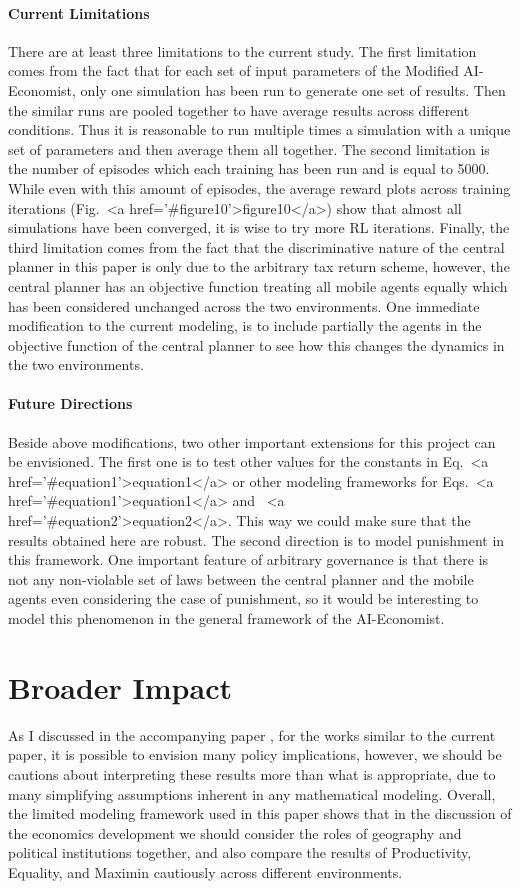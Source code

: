 \documentclass{article}
\begin{document}
\paragraph{Current Limitations} There are at least three limitations to the current study. The first limitation comes from the fact that for each set of input parameters of the Modified AI-Economist, only one simulation has been run to generate one set of results. Then the similar runs are pooled together to have average results across different conditions. Thus it is reasonable to run multiple times a simulation with a unique set of parameters and then average them all together. The second limitation is the number of episodes which each training has been run and is equal to 5000. While even with this amount of episodes, the average reward plots across training iterations (Fig.~<a href='#figure10'>figure10</a>) show that almost all simulations have been converged, it is wise to try more RL iterations. Finally, the third limitation comes from the fact that the discriminative nature of the central planner in this paper is only due to the arbitrary tax return scheme, however, the central planner has an objective function treating all mobile agents equally which has been considered unchanged across the two environments. One immediate modification to the current modeling, is to include partially the agents in the objective function of the central planner to see how this changes the dynamics in the two environments.

\paragraph{Future Directions} Beside above modifications, two other important extensions for this project can be envisioned. The first one is to test other values for the constants in Eq.~<a href='#equation1'>equation1</a> or other modeling frameworks for Eqs.~<a href='#equation1'>equation1</a> and ~<a href='#equation2'>equation2</a>. This way we could make sure that the results obtained here are robust. The second direction is to model punishment in this framework. One important feature of arbitrary governance is that there is not any non-violable set of laws between the central planner and the mobile agents even considering the case of punishment, so it would be interesting to model this phenomenon in the general framework of the AI-Economist.

\section{Broader Impact}
As I discussed in the accompanying paper \citep{Dizaji2023a}, for the works similar to the current paper, it is possible to envision many policy implications, however, we should be cautions about interpreting these results more than what is appropriate, due to many simplifying assumptions inherent in any mathematical modeling. Overall, the limited modeling framework used in this paper shows that in the discussion of the economics development we should consider the roles of geography and political institutions together, and also compare the results of Productivity, Equality, and Maximin cautiously across different environments. 
\end{document}
